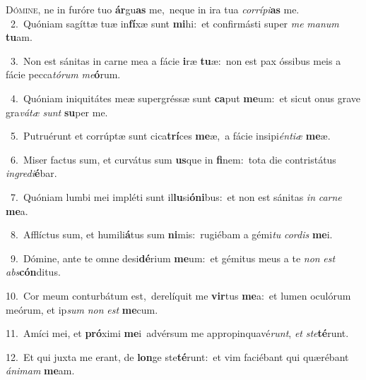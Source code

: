 \lettrine{\initial\textcolor{\initialcolor}{D}}{ómine,} ne in furóre tuo \textbf{ár}\-gu\textbf{as} me,~\star neque in ira tua \textit{cor}\-\textit{rí}\textit{pi}\textbf{as} me.\\
{\numbfont\textcolor{\numbcolor}{~2.}}~Quóniam sagíttæ tuæ in\-\textbf{fí}\-xæ sunt \textbf{mi}\-hi:~\star et confirmásti super \textit{me} \textit{ma}\-\textit{num} \textbf{tu}\-am.\par
{\numbfont\textcolor{\numbcolor}{~3.}}~Non est sánitas in carne mea a fácie \textbf{i}\-ræ \textbf{tu}\-æ:~\star non est pax óssibus meis a fácie pecca\-\textit{tó}\-\textit{rum} \textit{me}\-\textbf{ó}rum.\par
{\numbfont\textcolor{\numbcolor}{~4.}}~Quóniam iniquitátes meæ supergréssæ sunt \textbf{ca}\-put \textbf{me}\-um:~\star et sicut onus grave gra\-\textit{vá}\-\textit{tæ} \textit{sunt} \textbf{su}\-per me.\par
{\numbfont\textcolor{\numbcolor}{~5.}}~Putruérunt et corrúptæ sunt cica\-\textbf{trí}\-ces \textbf{me}\-æ,~\star a fácie insipi\-\textit{én}\-\textit{ti}\textit{æ} \textbf{me}\-æ.\par
{\numbfont\textcolor{\numbcolor}{~6.}}~Miser factus sum, et curvátus sum \textbf{us}\-que in \textbf{fi}\-nem:~\star tota die contristátus \textit{in}\-\textit{gre}\textit{di}\textbf{é}bar.\par
{\numbfont\textcolor{\numbcolor}{~7.}}~Quóniam lumbi mei impléti sunt il\-\textbf{lu}\-si\-\textbf{ó}\-\textbf{ni}bus:~\star et non est sánitas \textit{in} \textit{car}\-\textit{ne} \textbf{me}\-a.\par
{\numbfont\textcolor{\numbcolor}{~8.}}~Afflíctus sum, et humili\-\textbf{á}\-tus sum \textbf{ni}\-mis:~\star rugiébam a gémi\textit{tu} \textit{cor}\-\textit{dis} \textbf{me}\-i.\par
{\numbfont\textcolor{\numbcolor}{~9.}}~Dómine, ante te omne desi\-\textbf{dé}\-rium \textbf{me}\-um:~\star et gémitus meus a te \textit{non} \textit{est} \textit{abs}\-\textbf{cón}ditus.\par
{\numbfont\textcolor{\numbcolor}{10.}}~Cor meum conturbátum est,~\dagger derelíquit me \textbf{vir}\-tus \textbf{me}\-a:~\star et lumen oculórum meórum, et ip\textit{sum} \textit{non} \textit{est} \textbf{me}\-cum.\par
{\numbfont\textcolor{\numbcolor}{11.}}~Amíci mei, et \textbf{pró}\-ximi \textbf{me}\-i~\star advérsum me appropinquavé\-\textit{runt}\-, \textit{et} \textit{ste}\-\textbf{té}runt.\par
{\numbfont\textcolor{\numbcolor}{12.}}~Et qui juxta me erant, de \textbf{lon}\-ge ste\-\textbf{té}\-runt:~\star et vim faciébant qui quærébant \textit{á}\-\textit{ni}\textit{mam} \textbf{me}\-am.\par
